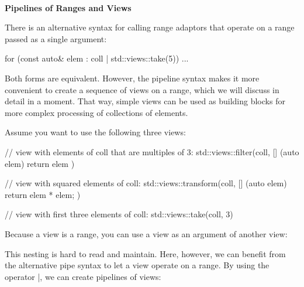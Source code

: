 \noindent
\hspace*{\fill} \\ %
\textbf{Pipelines of Ranges and Views}

There is an alternative syntax for calling range adaptors that operate on a range passed as a single argument:

\begin{cpp}
for (const auto& elem : coll | std::views::take(5)) {
	...
}
\end{cpp}

Both forms are equivalent. However, the pipeline syntax makes it more convenient to create a sequence of views on a range, which we will discuss in detail in a moment. That way, simple views can be used as building blocks for more complex processing of collections of elements.

Assume you want to use the following three views:

\begin{cpp}
// view with elements of coll that are multiples of 3:
std::views::filter(coll, [] (auto elem) {
	return elem %
})

// view with squared elements of coll:
std::views::transform(coll, [] (auto elem) {
	return elem * elem;
})

// view with first three elements of coll:
std::views::take(coll, 3)
\end{cpp}

Because a view is a range, you can use a view as an argument of another view:


This nesting is hard to read and maintain. Here, however, we can benefit from the alternative pipe syntax to let a view operate on a range. By using the operator |, we can create pipelines of views:


